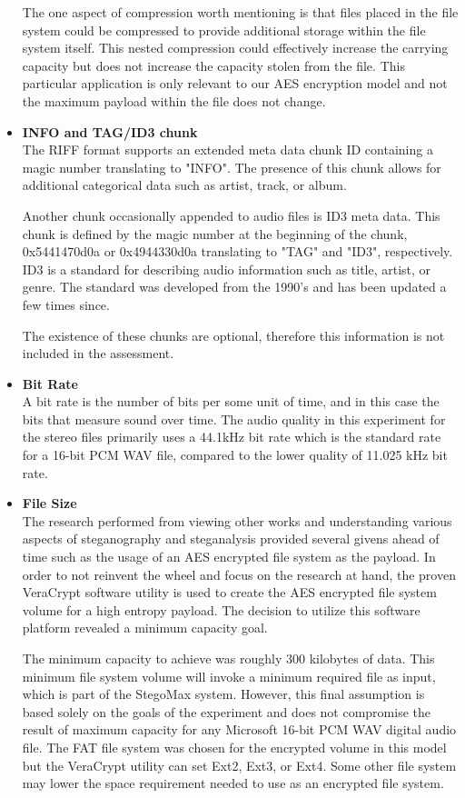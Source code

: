 \documentclass[letterpaper]{article}
\begin{document}
\begin{itemize}
The one aspect of compression worth mentioning is that files placed in the file system could be compressed to provide additional storage within the file system itself. This nested compression could effectively increase the carrying capacity but does not increase the capacity stolen from the file. This particular application is only relevant to our AES encryption model and not the maximum payload within the file does not change.

\item \textbf{INFO and TAG/ID3 chunk}\\
The RIFF format supports an extended meta data chunk ID containing a magic number translating to "INFO". The presence of this chunk allows for additional categorical data such as artist, track, or album. 

Another chunk occasionally appended to audio files is ID3 meta data. This chunk is defined by the magic number at the beginning of the chunk, 0x5441470d0a or 0x4944330d0a translating to "TAG" and "ID3", respectively. \cite{nilsson2004id3v2} ID3 is a standard for describing audio information such as title, artist, or genre. The standard was developed from the 1990's and has been updated a few times since.  

The existence of these chunks are optional, therefore this information is not included in the assessment.

\item \textbf{Bit Rate}\\
A bit rate is the number of bits per some unit of time, and in this case the bits that measure sound over time. The audio quality in this experiment for the stereo files primarily uses a 44.1kHz bit rate which is the standard rate for a 16-bit PCM WAV file, compared to the lower quality of 11.025 kHz bit rate.

\item \textbf{File Size}\\
The research performed from viewing other works and understanding various aspects of steganography and steganalysis provided several givens ahead of time such as the usage of an AES encrypted file system as the payload. In order to not reinvent the wheel and focus on the research at hand, the proven VeraCrypt software utility is used to create the AES encrypted file system volume for a high entropy payload. The decision to utilize this software platform revealed a minimum capacity goal. 

The minimum capacity to achieve was roughly 300 kilobytes of data. This minimum file system volume will invoke a minimum required file as input, which is part of the StegoMax system. However, this final assumption is based solely on the goals of the experiment and does not compromise the result of maximum capacity for any Microsoft 16-bit PCM WAV digital audio file.
The FAT file system was chosen for the encrypted volume in this model but the VeraCrypt utility can set Ext2, Ext3, or Ext4. Some other file system may lower the space requirement needed to use as an encrypted file system.


\end{itemize}
\end{document}
